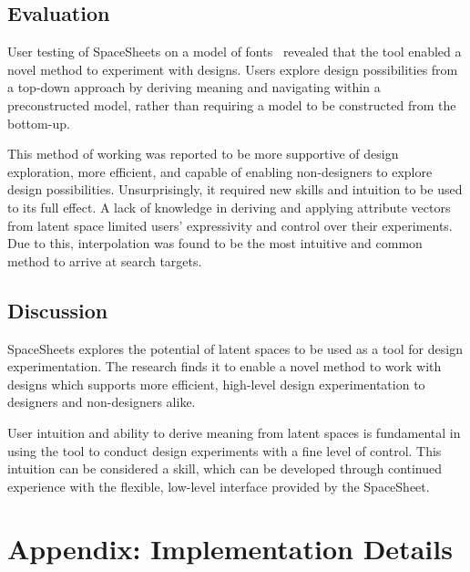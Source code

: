 \documentclass[letterpaper]{article}
\begin{document}
\subsection{Evaluation}

User testing of SpaceSheets on a model of fonts~\cite{loh18} revealed that the tool enabled a novel method to experiment with designs. Users explore design possibilities from a top-down approach by deriving meaning and navigating within a preconstructed model, rather than requiring a model to be constructed from the bottom-up.

This method of working was reported to be more supportive of design exploration, more efficient, and capable of enabling non-designers to explore design possibilities. Unsurprisingly, it required new skills and intuition to be used to its full effect. A lack of knowledge in deriving and applying attribute vectors from latent space limited users’ expressivity and control over their experiments. Due to this, interpolation was found to be the most intuitive and common method to arrive at search targets.


\subsection{Discussion}

SpaceSheets explores the potential of latent spaces to be used as a tool for design experimentation. The research finds it to enable a novel method to work with designs which supports more efficient, high-level design experimentation to designers and non-designers alike. 

User intuition and ability to derive meaning from latent spaces is fundamental in using the tool to conduct design experiments with a fine level of control. This intuition can be considered a skill, which can be developed through continued experience with the flexible, low-level interface provided by the SpaceSheet.





\onecolumn

\pagebreak

\normalsize


\section*{Appendix: Implementation Details}
\end{document}

